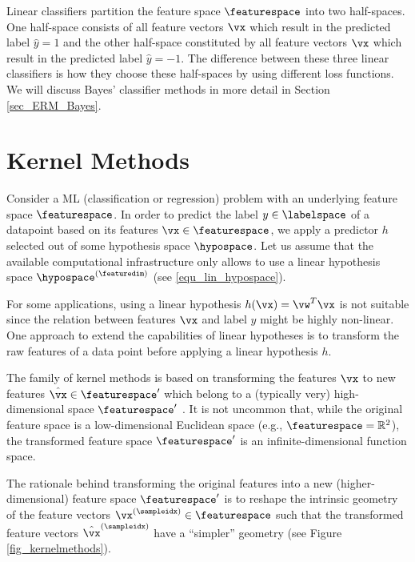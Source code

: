\documentclass[12pt]{report}
\begin{document}
Linear classifiers partition the feature space $\featurespace$ into two half-spaces. 
One half-space consists of all feature vectors $\vx$ which result in the 
predicted label $\hat{y}=1$ and the other half-space constituted by all 
feature vectors $\vx$ which result in the predicted label $\hat{y}=-1$. 
The difference between these three linear classifiers is how they choose 
these half-spaces by using different loss functions. We will discuss 
Bayes' classifier methods in more detail in Section \ref{sec_ERM_Bayes}.  

 
\section{Kernel Methods} 
\label{sec_kernel_methods}

Consider a ML (classification or regression) problem with an 
underlying feature space $\featurespace$. In order to predict 
the label $y \in \labelspace$ of a datapoint based on its 
features $\vx \in \featurespace$, we apply a predictor $h$ 
selected out of some hypothesis space $\hypospace$. Let 
us assume that the available computational infrastructure only 
allows to use a linear hypothesis space $\hypospace^{(\featuredim)}$ (see \eqref{equ_lin_hypospace}).

For some applications, using a linear hypothesis $h(\vx)=\vw^{T}\vx$ 
is not suitable since the relation between features $\vx$ and label $y$ 
might be highly non-linear. %
One approach to extend the capabilities of linear hypotheses 
is to transform the raw features of a data point before applying a 
linear hypothesis $h$. 

The family of kernel methods is based on transforming the 
features $\vx$ to new features $\hat{\vx} \in \featurespace'$ 
which belong to a (typically very) high-dimensional space $\featurespace'$ \cite{LampertNowKernel}. It is 
not uncommon that, while the original feature space is a 
low-dimensional Euclidean space (e.g., $\featurespace = \mathbb{R}^{2}$), 
the transformed feature space $\featurespace'$ is an infinite-dimensional function space. 

The rationale behind transforming the original features into a 
new (higher-dimensional) feature space $\featurespace'$ is to 
reshape the intrinsic geometry of the feature vectors 
$\vx^{(\sampleidx)} \in \featurespace$ such that the transformed 
feature vectors $\hat{\vx}^{(\sampleidx)}$ have a ``simpler'' 
geometry (see Figure \ref{fig_kernelmethods}). 
\end{document}
